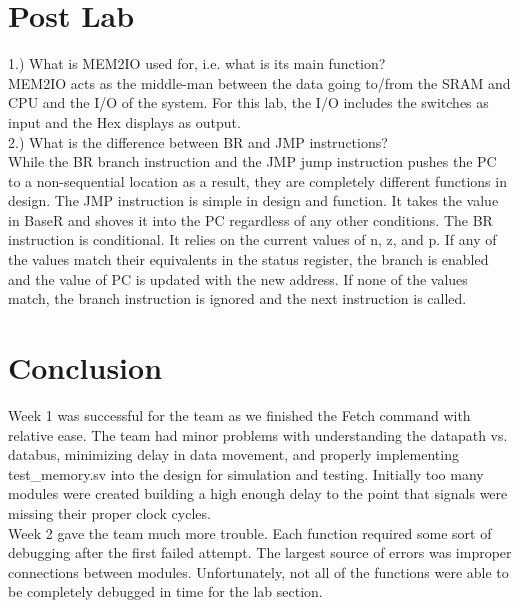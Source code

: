 \documentclass[journal, twocolumn, final,11pt,letterpaper]{IEEEtran}
\begin{document}
\section{Post Lab}



1.) What is MEM2IO used for, i.e. what is its main function? \\

MEM2IO acts as the middle-man between the data going to/from the SRAM and CPU and the I/O of the system.  For this lab, the I/O includes the switches as input and the Hex displays as output. \\  

2.) What is the difference between BR and JMP instructions?\\

While the BR branch instruction and the JMP jump instruction pushes the PC to a non-sequential location as a result, they are completely different functions in design.  The JMP instruction is simple in design and function.  It takes the value in BaseR and shoves it into the PC regardless of any other conditions.  The BR instruction is conditional.  It relies on the current values of n, z, and p.  If any of the values match their equivalents in the status register, the branch is enabled and the value of PC is updated with the new address.  If none of the values match, the branch instruction is ignored and the next instruction is called.  \\    

\section{Conclusion}
Week 1 was successful for the team as we finished the Fetch command with relative ease.  The team had minor problems with understanding the datapath vs. databus, minimizing delay in data movement, and properly implementing test\_memory.sv into the design for simulation and testing.  Initially too many modules were created building a high enough delay to the point that signals were missing their proper clock cycles.  \\

Week 2 gave the team much more trouble.  Each function required some sort of debugging after the first failed attempt.  The largest source of errors was improper connections between modules.  Unfortunately, not all of the functions were able to be completely debugged in time for the lab section. \\
\end{document}
